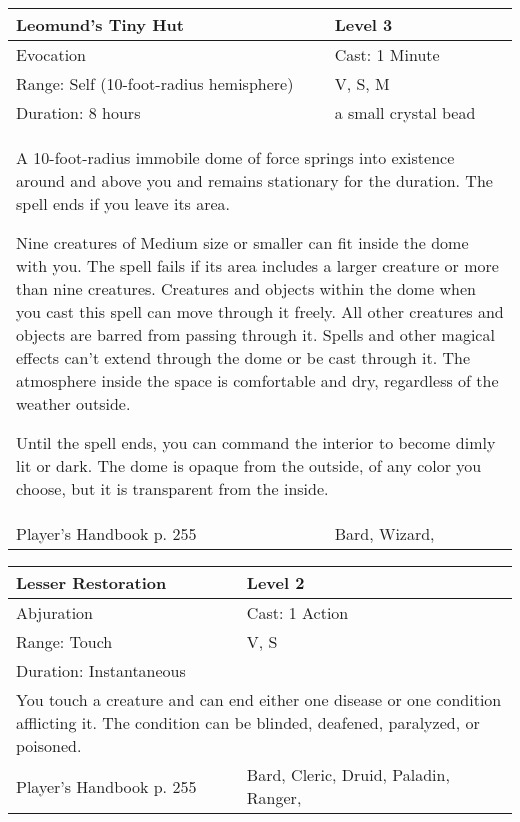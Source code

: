 \documentclass[11pt]{report}
\begin{document}
\begin{table}[H]
	\begin{tabular}{||p{6cm}|p{6cm}||}
		\hline\hline
		\bf{Leomund’s Tiny Hut} & Level 3\\ \hline
		Evocation & Cast: 1 Minute\\ \hline
		Range: Self (10-foot-radius hemisphere) & V, S, M\\ \hline
		Duration: 8 hours & a small crystal bead\\ \hline
		\multicolumn{2}{||p{12cm}||}{A 10-foot-radius immobile dome of force springs into existence around and above you and remains stationary for the duration. The spell ends if you leave its area.

Nine creatures of Medium size or smaller can fit inside the dome with you. The spell fails if its area includes a larger creature or more than nine creatures. Creatures and objects within the dome when you cast this spell can move through it freely. All other creatures and objects are barred from passing through it. Spells and other magical effects can’t extend through the dome or be cast through it. The atmosphere inside the space is comfortable and dry, regardless of the weather outside.

Until the spell ends, you can command the interior to become dimly lit or dark. The dome is opaque from the outside, of any color you choose, but it is transparent from the inside.}\\ \hline
Player's Handbook p. 255 & Bard, Wizard, \\ \hline\hline
	\end{tabular}
\end{table}

\begin{table}[H]
	\begin{tabular}{||p{6cm}|p{6cm}||}
		\hline\hline
		\bf{Lesser Restoration} & Level 2\\ \hline
		Abjuration & Cast: 1 Action\\ \hline
		Range: Touch & V, S\\ \hline
		Duration: Instantaneous & \\ \hline
		\multicolumn{2}{||p{12cm}||}{You touch a creature and can end either one disease or one condition afflicting it. The condition can be blinded, deafened, paralyzed, or poisoned.}\\ \hline
Player's Handbook p. 255 & Bard, Cleric, Druid, Paladin, Ranger, \\ \hline\hline
	\end{tabular}
\end{table}
\end{document}
